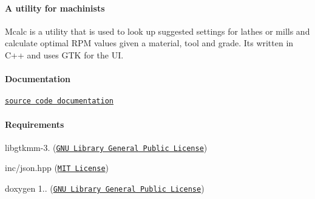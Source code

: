 \paragraph*{A utility for machinists}

Mcalc is a utility that is used to look up suggested settings for lathes or mills and calculate optimal R\+PM values given a material, tool and grade. It\textquotesingle{}s written in C++ and uses G\+TK for the UI.

\paragraph*{Documentation}

\href{https://mjhouse.github.io/mcalc/}{\tt source code documentation}

\paragraph*{Requirements}


\begin{DoxyItemize}
\item libgtkmm-\/3. (\href{https://www.gtkmm.org/en/license.html}{\tt G\+NU Library General Public License})
\item inc/json.\+hpp (\href{https://github.com/nlohmann/json#license}{\tt M\+IT License})
\item doxygen 1.. (\href{http://www.stack.nl/~dimitri/doxygen/}{\tt G\+NU Library General Public License}) 
\end{DoxyItemize}
